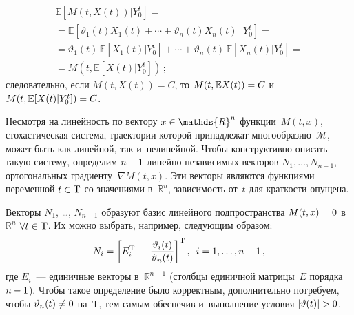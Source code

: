 \begin{multicols}{2}
\noindent
\begin{multline*}
  \mathbb{E} \left[ M(t,X(t)) | Y_0^t \right] ={}\\
  {}= 
  \mathbb{E} \left[ \vartheta_1(t) X_1(t) + \cdots + \vartheta_n(t) X_n(t) \,|\, 
  Y_0^t \right] ={} \\
{}  = \vartheta_1(t) \, \mathbb{E} \left[ X_1(t) | Y_0^t \right] + \cdots + 
\vartheta_n(t) \, \mathbb{E} \left[ X_n(t) | Y_0^t \right] = {}\\
{}=
M\left(t,\mathbb{E}\left[X(t)|Y_0^t\right]\right)\,;
\end{multline*}
следовательно, если $M(t,X(t)) = C$, 
то $M(t,\mathbb{E} X(t)) \hm= C$ и~$M(t,\mathbb{E}[X(t)|Y_0^t]) \hm= C$.

\pagebreak

Несмотря на линейность по вектору $x \hm\in \mathds{R}^n$ функции~$M(t,x)$, 
стохастическая система, траектории которой принадлежат многообразию~$\mathcal{M}$, 
может быть как линейной, так и~нелинейной. Чтобы конструктивно описать такую систему, 
определим $n\hm-1$ линейно независимых векторов  $N_1, \ldots, N_{n-1}$, 
ортогональных градиенту~$\nabla M(t,x)$. Эти векторы являются функциями переменной 
$t \hm\in \mathrm{T}$ со значениями в~$\mathds{R}^n$, зависимость от~$t$ 
для краткости опущена.

Векторы $N_1$, \dots, $N_{n-1}$ образуют базис линейного подпространства $M(t,x) \hm= 0$ 
в~$\mathds{R}^n$ $\forall t \hm\in \mathrm{T}$. Их можно выбрать, например, 
следующим образом:
$$
  N_i = \left[ E_i^{{\mathrm{T}}} \  -\displaystyle\frac{\displaystyle \vartheta_i(t)\mathstrut}{\displaystyle \vartheta_n(t)\mathstrut} \right]^{{\mathrm{T}}},\enskip
  i = 1,\dots,n-1\,,
$$
где $E_i$~--- единичные векторы в~$\mathds{R}^{n-1}$ (столбцы единичной матрицы~$E$ 
порядка~$n\hm-1$). Чтобы такое определение было корректным, дополнительно потребуем,
 чтобы $\vartheta_n(t) \hm\neq 0$ на~$\mathrm{T}$, тем самым обеспечив и~выполнение 
 условия $|\vartheta(t)| \hm> 0$.


\end{multicols}
